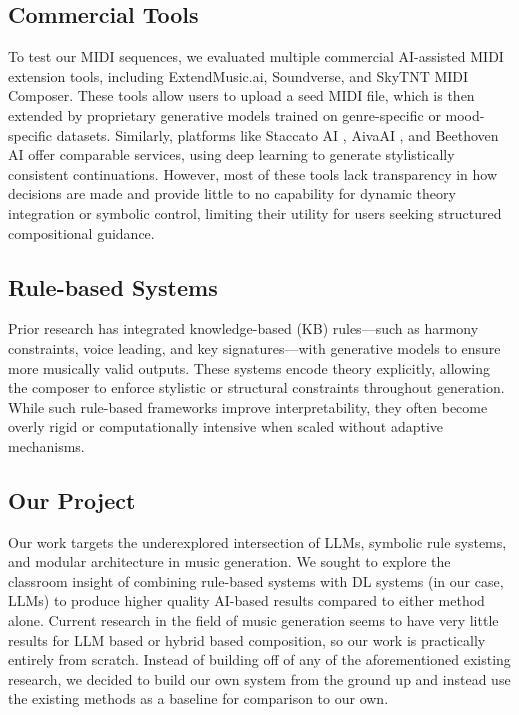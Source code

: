 \documentclass[conference]{IEEEtran}
\begin{document}
\subsection{Commercial Tools}

To test our MIDI sequences, we evaluated multiple commercial AI-assisted MIDI extension tools, including ExtendMusic.ai, Soundverse, and SkyTNT MIDI Composer. These tools allow users to upload a seed MIDI file, which is then extended by proprietary generative models trained on genre-specific or mood-specific datasets. Similarly, platforms like Staccato AI \cite{staccato}, AivaAI \cite{aiva}, and Beethoven AI \cite{beatoven} offer comparable services, using deep learning to generate stylistically consistent continuations. However, most of these tools lack transparency in how decisions are made and provide little to no capability for dynamic theory integration or symbolic control, limiting their utility for users seeking structured compositional guidance.

\subsection{Rule-based Systems}

Prior research has integrated knowledge-based (KB) rules—such as harmony constraints, voice leading, and key signatures—with generative models to ensure more musically valid outputs. These systems encode theory explicitly, allowing the composer to enforce stylistic or structural constraints throughout generation. While such rule-based frameworks improve interpretability, they often become overly rigid or computationally intensive when scaled without adaptive mechanisms.

\subsection{Our Project}

Our work targets the underexplored intersection of LLMs, symbolic rule systems, and modular architecture in music generation. 
We sought to explore the classroom insight of combining rule-based systems with DL systems (in our case, LLMs) to produce higher quality AI-based results compared to either method alone.
Current research in the field of music generation seems to have very little results for LLM based or hybrid based composition, so our work is practically entirely from scratch. 
Instead of building off of any of the aforementioned existing research, we decided to build our own system from the ground up and instead use the existing methods as a baseline for comparison to our own.
\end{document}
